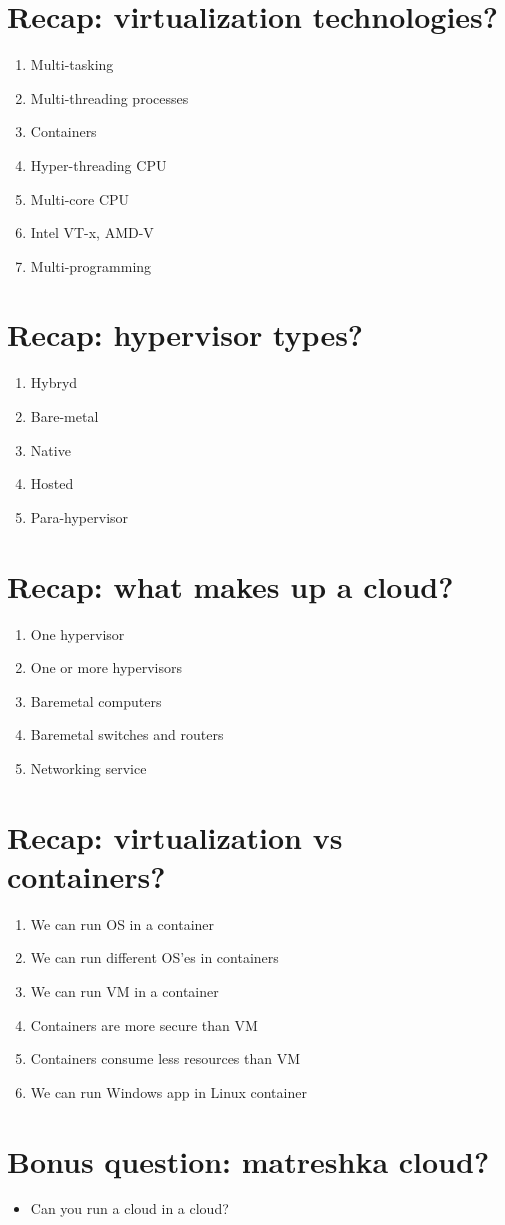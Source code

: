 \documentclass[11pt]{article}
\begin{document}
\section*{Recap: virtualization technologies?}
\label{sec:org6ea0018}
\begin{enumerate}
\item Multi-tasking
\item Multi-threading processes
\item Containers
\item Hyper-threading CPU
\item Multi-core CPU
\item Intel VT-x, AMD-V
\item Multi-programming
\end{enumerate}

\section*{Recap: hypervisor types?}
\label{sec:orgeffca6a}
\begin{enumerate}
\item Hybryd
\item Bare-metal
\item Native
\item Hosted
\item Para-hypervisor
\end{enumerate}

\section*{Recap: what makes up a cloud?}
\label{sec:org83e4940}
\begin{enumerate}
\item One hypervisor
\item One or more hypervisors
\item Baremetal computers
\item Baremetal switches and routers
\item Networking service
\end{enumerate}

\section*{Recap: virtualization vs containers?}
\label{sec:org11de2fd}
\begin{enumerate}
\item We can run OS in a container
\item We can run different OS'es in containers
\item We can run VM in a container
\item Containers are more secure than VM
\item Containers consume less resources than VM
\item We can run Windows app in Linux container
\end{enumerate}

\section*{Bonus question: matreshka cloud?}
\label{sec:org98d2777}
\begin{itemize}
\item Can you run a cloud in a cloud?
\end{itemize}
\end{document}
